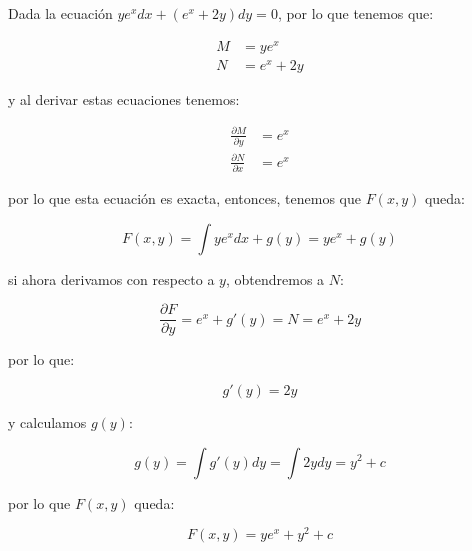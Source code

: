 		\begin{ejemplo}
			Dada la ecuación $y e^x dx + (e^x + 2 y) dy = 0$, por lo que tenemos que:

			\begin{align*}
				M &= y e^x \\
				N &= e^x + 2 y
			\end{align*}

			y al derivar estas ecuaciones tenemos:

			\begin{align*}
				\frac{\partial M}{\partial y} &= e^x \\
				\frac{\partial N}{\partial x} &= e^x
			\end{align*}

			por lo que esta ecuación es exacta, entonces, tenemos que $F(x, y)$ queda:

			\begin{equation*}
				F(x, y) = \int y e^x dx + g(y) = y e^x + g(y)
			\end{equation*}

			si ahora derivamos con respecto a $y$, obtendremos a $N$:

			\begin{equation*}
				\frac{\partial F}{\partial y} = e^x + g'(y) = N = e^x + 2 y
			\end{equation*}

			por lo que:

			\begin{equation*}
				g'(y) = 2 y
			\end{equation*}

			y calculamos $g(y)$:

			\begin{equation*}
				g(y) = \int g'(y) dy = \int 2y dy = y^2 + c
			\end{equation*}

			por lo que $F(x, y)$ queda:

			\begin{equation*}
				F(x, y) = y e^x + y^2 + c
			\end{equation*}
		\end{ejemplo}

